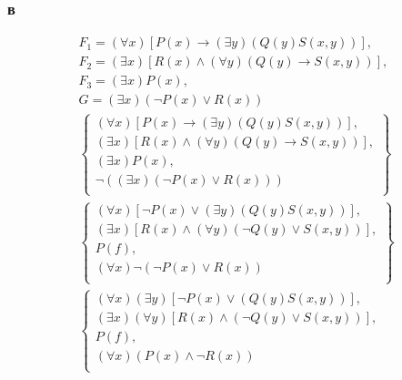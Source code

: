 \documentclass[12pt]{article}
\begin{document}
\subsubsection{в}
\begin{gather*}
  F_1 = \left(\forall x\right)\left[P(x) \rightarrow \left(\exists y\right)\left(Q(y)S(x, y)\right)\right], \\
  F_2 = \left(\exists x\right)\left[R(x)\wedge\left(\forall y\right)\left(Q(y)\rightarrow S(x,y)\right)\right], \\
  F_3 = \left(\exists x\right)P(x), \\
  G = \left(\exists x\right)\left(\neg P(x) \vee R(x)\right) \\
  \left\{
    \begin{array}{c}
      \left(\forall x\right)\left[P(x) \rightarrow \left(\exists y\right)\left(Q(y)S(x, y)\right)\right], \\
      \left(\exists x\right)\left[R(x)\wedge\left(\forall y\right)\left(Q(y)\rightarrow S(x,y)\right)\right], \\
      \left(\exists x\right)P(x), \\
      \neg\left(\left(\exists x\right)\left(\neg P(x) \vee R(x)\right)\right) \\
    \end{array}
  \right\} \\
  \left\{
    \begin{array}{c}
      \left(\forall x\right)\left[\neg P(x) \vee \left(\exists y\right)\left(Q(y)S(x, y)\right)\right], \\
      \left(\exists x\right)\left[R(x)\wedge\left(\forall y\right)\left(\neg Q(y)\vee S(x,y)\right)\right], \\
      P(f), \\
      \left(\forall x\right)\neg\left(\neg P(x) \vee R(x)\right) \\
    \end{array}
  \right\} \\
  \left\{
    \begin{array}{c}
      \left(\forall x\right)\left(\exists y\right)\left[\neg P(x) \vee \left(Q(y)S(x, y)\right)\right], \\
      \left(\exists x\right)\left(\forall y\right)\left[R(x)\wedge\left(\neg Q(y)\vee S(x,y)\right)\right], \\
      P(f), \\
      \left(\forall x\right)\left(P(x) \wedge \neg R(x)\right) \\
    \end{array}

\end{gather*}
\end{document}
